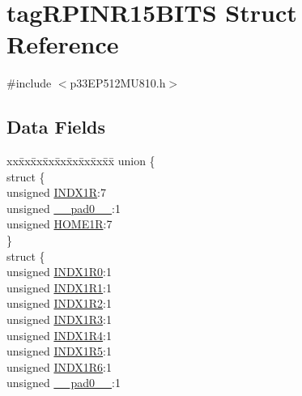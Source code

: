 \hypertarget{structtag_r_p_i_n_r15_b_i_t_s}{}\section{tag\+R\+P\+I\+N\+R15\+B\+I\+TS Struct Reference}
\label{structtag_r_p_i_n_r15_b_i_t_s}


{\ttfamily \#include $<$p33\+E\+P512\+M\+U810.\+h$>$}

\subsection*{Data Fields}
\begin{DoxyCompactItemize}
\item 
\begin{tabbing}
xx\=xx\=xx\=xx\=xx\=xx\=xx\=xx\=xx\=\kill
union \{\\
\>struct \{\\
\>\>unsigned \hyperlink{structtag_r_p_i_n_r15_b_i_t_s_aa5f0a93e4e39ab0967fea8355a3aae5c}{INDX1R}:7\\
\>\>unsigned \hyperlink{structtag_r_p_i_n_r15_b_i_t_s_adf71f3d8410c1f1dbbc96680a92c49af}{\_\_pad0\_\_}:1\\
\>\>unsigned \hyperlink{structtag_r_p_i_n_r15_b_i_t_s_a92b0f3fde73950315dd17b3b324d451b}{HOME1R}:7\\
\>\} \\
\>struct \{\\
\>\>unsigned \hyperlink{structtag_r_p_i_n_r15_b_i_t_s_a21088fb79217cec65b14b8c528fc4434}{INDX1R0}:1\\
\>\>unsigned \hyperlink{structtag_r_p_i_n_r15_b_i_t_s_af75b898678c14a6a7143fb14de4cedf5}{INDX1R1}:1\\
\>\>unsigned \hyperlink{structtag_r_p_i_n_r15_b_i_t_s_a25cd9c532e4f0dd2094a07e6a330f8dc}{INDX1R2}:1\\
\>\>unsigned \hyperlink{structtag_r_p_i_n_r15_b_i_t_s_aafaf42ee5f06b91d11565604d5ba333e}{INDX1R3}:1\\
\>\>unsigned \hyperlink{structtag_r_p_i_n_r15_b_i_t_s_a9b47791604b5157a4e2997b01cec40cf}{INDX1R4}:1\\
\>\>unsigned \hyperlink{structtag_r_p_i_n_r15_b_i_t_s_a577bbaff5fb0b4bfda195039ee84ea37}{INDX1R5}:1\\
\>\>unsigned \hyperlink{structtag_r_p_i_n_r15_b_i_t_s_a0d48947972e3f2dd57e27d6d7f37fff4}{INDX1R6}:1\\
\>\>unsigned \hyperlink{structtag_r_p_i_n_r15_b_i_t_s_adf71f3d8410c1f1dbbc96680a92c49af}{\_\_pad0\_\_}:1\\

\end{tabbing}
\end{DoxyCompactItemize}
